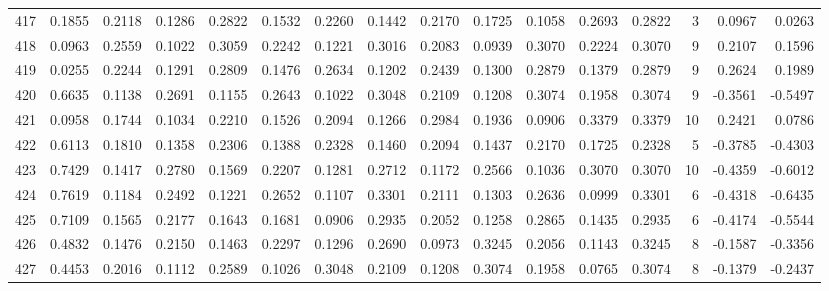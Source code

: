\begin{tabular}{lrrrrrrrrrrrrrrr}
417 &      0.1855 &  0.2118 &  0.1286 &  0.2822 &  0.1532 &  0.2260 &  0.1442 &  0.2170 &  0.1725 &  0.1058 &   0.2693 &     0.2822 &      3 &                    0.0967 &                     0.0263 \\
418 &      0.0963 &  0.2559 &  0.1022 &  0.3059 &  0.2242 &  0.1221 &  0.3016 &  0.2083 &  0.0939 &  0.3070 &   0.2224 &     0.3070 &      9 &                    0.2107 &                     0.1596 \\
419 &      0.0255 &  0.2244 &  0.1291 &  0.2809 &  0.1476 &  0.2634 &  0.1202 &  0.2439 &  0.1300 &  0.2879 &   0.1379 &     0.2879 &      9 &                    0.2624 &                     0.1989 \\
420 &      0.6635 &  0.1138 &  0.2691 &  0.1155 &  0.2643 &  0.1022 &  0.3048 &  0.2109 &  0.1208 &  0.3074 &   0.1958 &     0.3074 &      9 &                   -0.3561 &                    -0.5497 \\
421 &      0.0958 &  0.1744 &  0.1034 &  0.2210 &  0.1526 &  0.2094 &  0.1266 &  0.2984 &  0.1936 &  0.0906 &   0.3379 &     0.3379 &     10 &                    0.2421 &                     0.0786 \\
422 &      0.6113 &  0.1810 &  0.1358 &  0.2306 &  0.1388 &  0.2328 &  0.1460 &  0.2094 &  0.1437 &  0.2170 &   0.1725 &     0.2328 &      5 &                   -0.3785 &                    -0.4303 \\
423 &      0.7429 &  0.1417 &  0.2780 &  0.1569 &  0.2207 &  0.1281 &  0.2712 &  0.1172 &  0.2566 &  0.1036 &   0.3070 &     0.3070 &     10 &                   -0.4359 &                    -0.6012 \\
424 &      0.7619 &  0.1184 &  0.2492 &  0.1221 &  0.2652 &  0.1107 &  0.3301 &  0.2111 &  0.1303 &  0.2636 &   0.0999 &     0.3301 &      6 &                   -0.4318 &                    -0.6435 \\
425 &      0.7109 &  0.1565 &  0.2177 &  0.1643 &  0.1681 &  0.0906 &  0.2935 &  0.2052 &  0.1258 &  0.2865 &   0.1435 &     0.2935 &      6 &                   -0.4174 &                    -0.5544 \\
426 &      0.4832 &  0.1476 &  0.2150 &  0.1463 &  0.2297 &  0.1296 &  0.2690 &  0.0973 &  0.3245 &  0.2056 &   0.1143 &     0.3245 &      8 &                   -0.1587 &                    -0.3356 \\
427 &      0.4453 &  0.2016 &  0.1112 &  0.2589 &  0.1026 &  0.3048 &  0.2109 &  0.1208 &  0.3074 &  0.1958 &   0.0765 &     0.3074 &      8 &                   -0.1379 &                    -0.2437 \\

\end{tabular}
